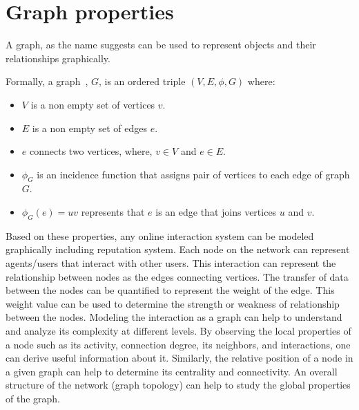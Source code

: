 \section{Graph properties}
A graph, as the name suggests can be used to represent objects and their
relationships graphically. \par
Formally, a graph~\cite{bondy1976graph}, $G$, is an ordered triple $(V,E,\phi,
G)$ where:
\begin{itemize}
	\item $V$ is a non empty set of vertices $v$.
	\item $E$ is a non empty set of edges $e$.
	\item $e$ connects two vertices, where, $v \in V$ and $e \in E$.
	\item $\phi_G$ is an incidence function that assigns pair of vertices to
		each edge of graph $G$. 
	\item $\phi_G(e) = uv$ represents that $e$ is an edge that joins vertices $u$
		and $v$.
\end{itemize}
Based on these properties, any online interaction system can be modeled
graphically including reputation system. Each node on the network can represent
agents/users that interact with other users. This interaction can represent the
relationship between nodes as the edges connecting vertices. The transfer of
data between the nodes can be quantified to represent the weight of the edge.
This weight value can be used to determine the strength or weakness of
relationship between the nodes. Modeling the interaction as a graph can help to
understand and analyze its complexity at different levels. By observing the
local properties of a node such as its activity, connection degree, its
neighbors, and interactions, one can derive useful information about it.
Similarly, the relative position of a node in a given graph can help to
determine its centrality and connectivity. An overall structure of the network
(graph topology) can help to study the global properties of the graph.
